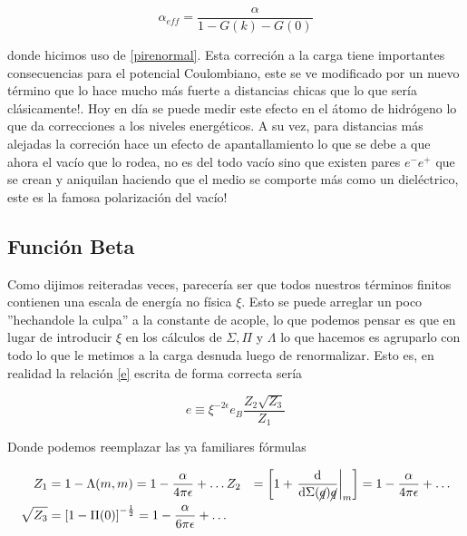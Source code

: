 \documentclass[tickz]{article}
\numberwithin{equation}{section}
\begin{document}
\begin{equation}\label{key}
\alpha_{eff} = \frac{\alpha}{1- G(k) - G(0)}
\end{equation} 

donde hicimos uso de \ref{pirenormal}. Esta correción a la carga tiene importantes consecuencias para el potencial Coulombiano, este se ve modificado por un nuevo término que lo hace mucho más fuerte a distancias chicas que lo que sería clásicamente!. Hoy en día se puede medir este efecto en el átomo de hidrógeno lo que da correcciones a los niveles energéticos. A su vez, para distancias más alejadas la correción hace un efecto de apantallamiento lo que se debe a que ahora el vacío que lo rodea, no es del todo vacío sino que existen pares $ e^{-}e^{+} $ que se crean y aniquilan haciendo que el medio se comporte más como un dieléctrico, este es la famosa polarización del vacío!


\subsection{Función Beta}

Como dijimos reiteradas veces, parecería ser que todos nuestros términos finitos contienen una escala de energía no física $ \xi $. Esto se puede arreglar un poco ''hechandole la culpa'' a la constante de acople, lo que podemos pensar es que en lugar de introducir $ \xi $ en los cálculos de $ \Sigma, \Pi $ y $ \Lambda $ lo que hacemos es agruparlo con todo lo que le metimos a la carga desnuda luego de renormalizar. Esto es, en realidad la relación \ref{e} escrita de forma correcta sería

\begin{equation}\label{exi}
e \equiv \xi^{-2\epsilon} e_B\frac{Z_2 \sqrt{Z_3}}{Z_1}
\end{equation}

Donde podemos reemplazar las ya familiares fórmulas

\begin{equation}\label{key}
\begin{aligned}
Z_1 &= 1- \Lambda(m,m) = 1 -\frac{\alpha}{4\pi \epsilon} + \dots
Z_2 &= \left[1 + \left.\frac{\mathrm{d}}{\mathrm{d\Sigma(\cancel{q})}\cancel{q}}\right|_m \right] = 1 -\frac{\alpha}{4\pi \epsilon} + \dots\\
\sqrt{Z_3} &= \left[1 - \Pi(0)\right]^{-\frac{1}{2}} = 1 -\frac{\alpha}{6\pi \epsilon} + \dots
\end{aligned}
\end{equation}
\end{document}
